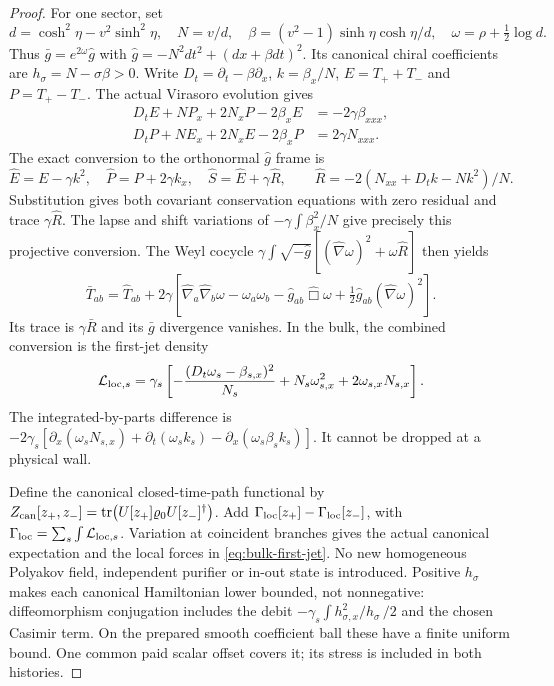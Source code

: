\begin{proof}
For one sector, set
\begin{equation}
 d=\cosh^2\eta-v^2\sinh^2\eta,\quad
 N=v/d,\quad \beta=(v^2-1)\sinh\eta\cosh\eta/d,\quad
 \omega=\rho+\tfrac12\log d.                               \label{eq:bulk-optical-ADM}
\end{equation}
Thus $\bar g=e^{2\omega}\hat g$ with
$\hat g=-N^2dt^2+(dx+\beta dt)^2$. Its canonical chiral coefficients
are $h_\sigma=N-\sigma\beta>0$. Write $D_t=\partial_t-\beta\partial_x$,
$k=\beta_x/N$, $E=T_++T_-$ and $P=T_+-T_-$. The actual Virasoro
evolution gives
\begin{align}
 D_tE+NP_x+2N_xP-2\beta_xE&=-2\gamma\beta_{xxx},\\
 D_tP+NE_x+2N_xE-2\beta_xP&= 2\gamma N_{xxx}.               \label{eq:bulk-canonical-Ward}
\end{align}
The exact conversion to the orthonormal $\hat g$ frame is
\begin{equation}
 \hat E=E-\gamma k^2,\quad \hat P=P+2\gamma k_x,\quad
 \hat S=\hat E+\gamma\hat R,\qquad
 \hat R=-2(N_{xx}+D_tk-Nk^2)/N.                           \label{eq:bulk-projective-conversion}
\end{equation}
Substitution gives both covariant conservation equations with zero
residual and trace $\gamma\hat R$. The lapse and shift variations of
$-\gamma\int\beta_x^2/N$ give precisely this projective conversion.
The Weyl cocycle $\gamma\int\sqrt{-\hat g}[(\hat\nabla\omega)^2+
\omega\hat R]$ then yields
\begin{equation}
 \bar T_{ab}=\hat T_{ab}+2\gamma\left[
 \hat\nabla_a\hat\nabla_b\omega-\omega_a\omega_b
 -\hat g_{ab}\hat\Box\omega+
 \tfrac12\hat g_{ab}(\hat\nabla\omega)^2\right].           \label{eq:bulk-Weyl-conversion}
\end{equation}
Its trace is $\gamma\bar R$ and its $\bar g$ divergence vanishes.
In the bulk, the combined conversion is the first-jet density
\begin{equation}
 \mathcal L_{{\rm loc},s}=\gamma_s\left[
 -\frac{(D_t\omega_s-\beta_{s,x})^2}{N_s}
 +N_s\omega_{s,x}^2+2\omega_{s,x}N_{s,x}\right].            \label{eq:bulk-first-jet}
\end{equation}
The integrated-by-parts difference is
$-2\gamma_s[\partial_x(\omega_sN_{s,x})+
\partial_t(\omega_sk_s)-\partial_x(\omega_s\beta_sk_s)]$.
It cannot be dropped at a physical wall.

Define the canonical closed-time-path functional by
$Z_{\rm can}[z_+,z_-]=\tr(U[z_+]\varrho_0U[z_-]^\dagger)$.
Add $\Gamma_{\rm loc}[z_+]-\Gamma_{\rm loc}[z_-]$, with
$\Gamma_{\rm loc}=\sum_s\int\mathcal L_{{\rm loc},s}$.
Variation at coincident branches gives the actual canonical expectation
and the local forces in \eqref{eq:bulk-first-jet}. No new homogeneous
Polyakov field, independent purifier or in-out state is introduced.
Positive $h_\sigma$ makes each canonical Hamiltonian lower bounded,
not nonnegative: diffeomorphism conjugation includes the debit
$-\gamma_s\int h_{\sigma,x}^2/h_\sigma\,/2$ and the chosen Casimir term.
On the prepared smooth coefficient ball these have a finite uniform
bound. One common paid scalar offset covers it; its stress is included
in both histories.


\end{proof}
